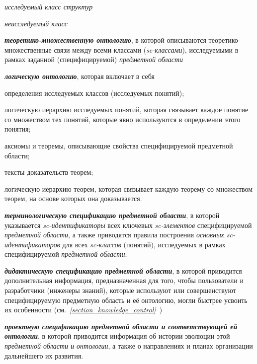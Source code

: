 \begin{textitemize}
\begin{textitemize}
\begin{textitemize}
	 		\item \textit{исследуемый класс структур\scnrolesign}
	 		\item \textit{неисследуемый класс\scnrolesign}
	 		\begin{SCn}
	 		\end{SCn}
	 	\end{textitemize}
 		\item \textbf{\textit{теоретико-множественную онтологию}}, в которой описываются теоретико-множественные связи между всеми классами (\textit{sc-классами}), исследуемыми в рамках заданной (специфицируемой) \textit{предметной области}
 		\item \textbf{\textit{логическую онтологию}}, которая включает в себя
 		\begin{textitemize}
 			\item определения исследуемых классов (исследуемых понятий);
 			\item логическую иерархию исследуемых понятий, которая связывает каждое понятие со множеством тех понятий, которые явно используются в определении этого понятия;
 			\item аксиомы и теоремы, описывающие свойства специфицируемой предметной области;
 			\item тексты доказательств теорем;
 			\item логическую иерархию теорем, которая связывает каждую теорему со множеством теорем, на основе которых она доказывается.
 		\end{textitemize}
 		\item \textbf{\textit{терминологическую спецификацию предметной области}}, в которой указывается \textit{sc-идентификаторы} всех ключевых \textit{sc-элементов} специфицируемой \textit{предметной области}, а также приводятся правила построения \textit{основных sc-идентификаторов} для всех \textit{sc-классов} (понятий), исследуемых в рамках специфицируемой \textit{предметной области};
 		\item \textbf{\textit{дидактическую спецификацию предметной области}}, в которой приводится дополнительная информация, предназначенная для того, чтобы пользователи и разработчики (инженеры знаний), которые используют или совершенствуют специфицируемую предметную область и её онтологию, могли быстрее усвоить их особенности (см.~\textit{\ref{section_knowledge_control}~})
 		\item \textbf{\textit{проектную спецификацию предметной области и соответствующей ей онтологии}}, в которой приводится информация об истории эволюции этой \textit{предметной области и онтологии}, а также о направлениях и планах организации дальнейшего их развития.
	 \end{textitemize}
\end{textitemize}	 

